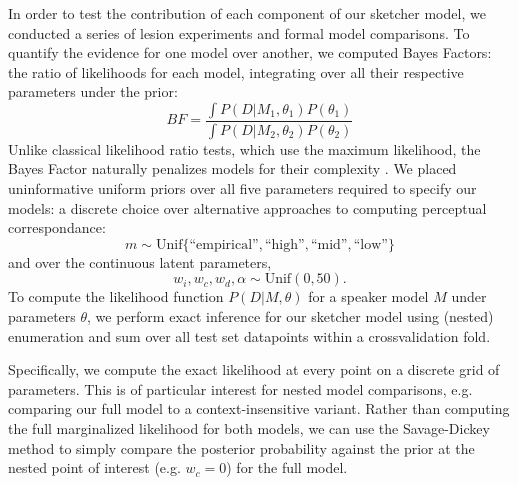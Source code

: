 \documentclass[9pt,twocolumn,twoside]{pnas-new}
\begin{document}
{In order to test the contribution of each component of our sketcher model, we conducted a series of lesion experiments and formal model comparisons.
To quantify the evidence for one model over another, we computed Bayes Factors:
the ratio of likelihoods for each model, integrating over all their respective parameters under the prior:
$$BF = \frac{\int P(D | M_1, \theta_1)P(\theta_1)}{\int P(D | M_2, \theta_2)P(\theta_2)}$$
Unlike classical likelihood ratio tests, which use the maximum likelihood, the Bayes Factor naturally penalizes models for their complexity \cite{wagenmakers2018bayesian,jefferys1992ockham}.
We placed uninformative uniform priors over all five parameters required to specify our models: a discrete choice over alternative approaches to computing perceptual correspondance: 
$$m \sim \textrm{Unif}\{\textrm{``empirical''}, \textrm{``high''}, \textrm{``mid''}, \textrm{``low''}\}$$
and over the continuous latent parameters, 
$$w_i, w_c, w_d, \alpha \sim \textrm{Unif}(0, 50).$$ 
To compute the likelihood function $P(D | M, \theta)$ for a speaker model $M$ under parameters $\theta$, we perform exact inference for our sketcher model using (nested) enumeration and sum over all test set datapoints within a crossvalidation fold. 



Specifically, we compute the exact likelihood at every point on a discrete grid of parameters.
This is of particular interest for nested model comparisons, e.g. comparing our full model to a context-insensitive variant.
Rather than computing the full marginalized likelihood for both models, we can use the Savage-Dickey method \cite{wagenmakers2010bayesian} to simply compare the posterior probability against the prior at the nested point of interest (e.g. $w_c = 0$) for the full model.

}
\end{document}
